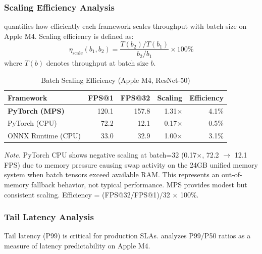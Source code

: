 \documentclass[10pt,twocolumn,a4paper]{article}
\theoremstyle{definition}
\theoremstyle{plain}
\begin{document}
\subsubsection{Scaling Efficiency Analysis}

 quantifies how efficiently each framework scales throughput with batch size on Apple M4. Scaling efficiency is defined as:
\begin{equation}
    \eta_{\text{scale}}(b_1, b_2) = \frac{T(b_2) / T(b_1)}{b_2 / b_1} \times 100\%
    \label{eq:scaling_efficiency}
\end{equation}
where $T(b)$ denotes throughput at batch size $b$.

\begin{table}[t]
\centering
\caption{Batch Scaling Efficiency (Apple M4, ResNet-50)}
\label{tab:scaling_efficiency}
\scriptsize
\setlength{\tabcolsep}{4pt}
\begin{tabular}{@{}lrrrr@{}}
\toprule
\textbf{Framework} & \textbf{FPS@1} & \textbf{FPS@32} & \textbf{Scaling} & \textbf{Efficiency} \\
\midrule
\textbf{PyTorch (MPS)} & 120.1 & 157.8 & 1.31$\times$ & 4.1\% \\
PyTorch (CPU) & 72.2 & 12.1 & 0.17$\times$ & 0.5\% \\
ONNX Runtime (CPU) & 33.0 & 32.9 & 1.00$\times$ & 3.1\% \\
\bottomrule
\end{tabular}

\vspace{0.5em}
\noindent\textit{Note.} PyTorch CPU shows negative scaling at batch=32 (0.17$\times$, 72.2 $\rightarrow$ 12.1 FPS) due to memory pressure causing swap activity on the 24GB unified memory system when batch tensors exceed available RAM. This represents an out-of-memory fallback behavior, not typical performance. MPS provides modest but consistent scaling. Efficiency = (FPS@32/FPS@1)/32 $\times$ 100\%.
\end{table}

\subsubsection{Tail Latency Analysis}

Tail latency (P99) is critical for production SLAs.  analyzes P99/P50 ratios as a measure of latency predictability on Apple M4.
\end{document}
